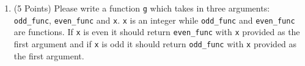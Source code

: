 \documentclass[11pt]{article}
\begin{document}
\begin{enumerate}
\vspace{2cm}

\item (5 Points)  Please write a function \texttt{g} which takes in three arguments: \texttt{odd\_func}, \texttt{even\_func} and \texttt{x}. \texttt{x} is an integer while \texttt{odd\_func} and \texttt{even\_func} are functions. If \texttt{x} is even it should return \texttt{even\_func} with \texttt{x} provided as the first argument and if \texttt{x} is odd it should return \texttt{odd\_func} with \texttt{x} provided as the first argument.


\end{enumerate}
\end{document}
